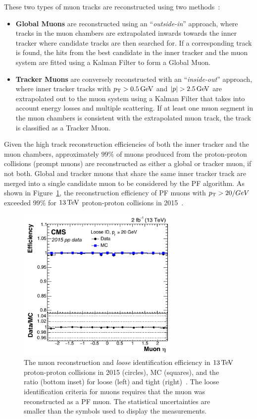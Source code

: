 These two types of muon tracks are reconstructed using two methods~\cite{Chatrchyan:2012xi}:
\begin{itemize}
\item \textbf{Global Muons} are reconstructed using an ``\emph{outside-in}'' approach, where tracks in the muon chambers are extrapolated inwards towards the inner tracker where candidate tracks are then searched for.
If a corresponding track is found, the hits from the best candidate in the inner tracker and the muon system are fitted using a Kalman Filter to form a Global Muon.
\item \textbf{Tracker Muons} are conversely reconstructed with an ``\emph{inside-out}'' approach, where inner tracker tracks with $p_{\mathrm{T}} > 0.5\,\text{Ge\hspace{-.08em}V}$ and $|p| > 2.5\,\text{Ge\hspace{-.08em}V}$ are extrapolated out to the muon system using a Kalman Filter that takes into account energy losses and multiple scattering.
If at least one muon segment in the muon chambers is consistent with the extrapolated muon track, the track is classified as a Tracker Muon.
\end{itemize}

Given the high track reconstruction efficiencies of both the inner tracker and the muon chambers, approximately $99\%$ of muons produced from the proton-proton collisions (prompt muons) are reconstructed as either a global or tracker muon, if not both.
Global and tracker muons that share the same inner tracker track are merged into a single candidate muon to be considered by the PF algorithm.
As shown in Figure~\ref{fig:muonRecoEff}, the reconstruction efficiency of PF muons with $p_{\mathrm{T}} > 20/GeV$ exceeded 99\% for $13\,\text{Te\hspace{-.08em}V}$ proton-proton collisions in 2015~\cite{Sirunyan:2018fpa}.

\begin{figure}[htbp]
\centering
\includegraphics[width=0.7\textwidth]{figs/data-mc/CMS-MUO-16-001_Figure_007.pdf}
\caption{The muon reconstruction and \emph{loose} identification efficiency in $13\,\text{Te\hspace{-.08em}V}$ proton-proton collisions in 2015 (circles), MC (squares), and the ratio (bottom inset) for loose (left) and tight (right)~\cite{Sirunyan:2018fpa}. The loose identification criteria for muons requires that the muon was reconstructed as a PF muon. The statistical uncertainties are smaller than the symbols used to display the measurements.}
\label{fig:muonRecoEff}
\end{figure}

